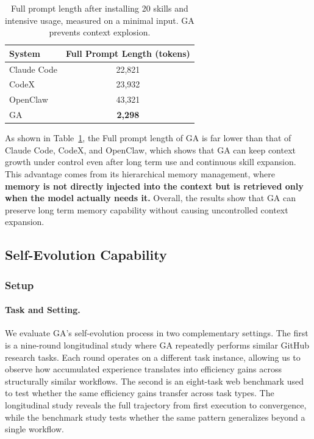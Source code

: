 \begin{table}[t]
\centering
\caption{Full prompt length after installing 20 skills and intensive usage, measured on a minimal input. GA prevents context explosion.}
\label{tab:context_explosion}
\begin{tabular}{lc}
\toprule
\textbf{System} & \textbf{Full Prompt Length (tokens)} \\
\midrule
Claude Code & 22,821 \\
CodeX & 23,932 \\
OpenClaw & 43,321 \\
GA & \textbf{2,298} \\
\bottomrule
\end{tabular}
\end{table}

As shown in Table~\ref{tab:context_explosion}, the Full prompt length of GA is far lower than that of Claude Code, CodeX, and OpenClaw, which shows that GA can keep context growth under control even after long term use and continuous skill expansion. 
This advantage comes from its hierarchical memory management, where \textbf{memory is not directly injected into the context but is retrieved only when the model actually needs it. }
Overall, the results show that GA can preserve long term memory capability without causing uncontrolled context expansion.

\subsection{Self-Evolution Capability}
\label{sec:self_evolution_capability}

\subsubsection{Setup}
\label{sec:exp_selfevolution_setup}

\paragraph{Task and Setting.}
We evaluate GA's self-evolution process in two complementary settings. The first is a nine-round longitudinal study where GA repeatedly performs similar GitHub research tasks. Each round operates on a different task instance, allowing us to observe how accumulated experience translates into efficiency gains across structurally similar workflows. The second is an eight-task web benchmark used to test whether the same efficiency gains transfer across task types. The longitudinal study reveals the full trajectory from first execution to convergence, while the benchmark study tests whether the same pattern generalizes beyond a single workflow.


